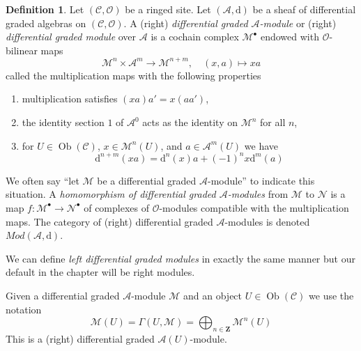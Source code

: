 \documentclass{stacks-project}
\theoremstyle{plain}
\theoremstyle{definition}
\newtheorem{definition}[subsection]{Definition}
\theoremstyle{remark}
\numberwithin{equation}{subsection}
\def\Ob{\mathop{\mathrm{Ob}}\nolimits}
\begin{document}
\begin{definition}
\label{definition-dgm}
Let $(\mathcal{C}, \mathcal{O})$ be a ringed site.
Let $(\mathcal{A}, \text{d})$ be a sheaf of differential graded algebras
on $(\mathcal{C}, \mathcal{O})$.
A (right) {\it differential graded $\mathcal{A}$-module} or (right)
{\it differential graded module} over $\mathcal{A}$
is a cochain complex $\mathcal{M}^\bullet$ endowed with
$\mathcal{O}$-bilinear maps
$$
\mathcal{M}^n \times \mathcal{A}^m \to \mathcal{M}^{n + m},\quad
(x, a) \longmapsto xa
$$
called the multiplication maps with the following properties
\begin{enumerate}
\item multiplication satisfies $(xa)a' = x(aa')$,
\item the identity section $1$ of $\mathcal{A}^0$
acts as the identity on $\mathcal{M}^n$ for all $n$,
\item for $U \in \Ob(\mathcal{C})$, $x \in \mathcal{M}^n(U)$, and
$a \in \mathcal{A}^m(U)$ we have
$$
\text{d}^{n + m}(xa) = \text{d}^n(x)a + (-1)^n x\text{d}^m(a)
$$
\end{enumerate}
We often say ``let $\mathcal{M}$ be a differential graded
$\mathcal{A}$-module'' to indicate this situation.
A {\it homomorphism of differential graded $\mathcal{A}$-modules}
from $\mathcal{M}$ to $\mathcal{N}$ is a map
$f : \mathcal{M}^\bullet \to \mathcal{N}^\bullet$ of complexes
of $\mathcal{O}$-modules compatible with the multiplication maps.
The category of (right) differential graded $\mathcal{A}$-modules
is denoted $\textit{Mod}(\mathcal{A}, \text{d})$.
\end{definition}

\noindent
We can define {\it left differential graded modules} in exactly the same manner
but our default in the chapter will be right modules.

\medskip\noindent
Given a differential graded $\mathcal{A}$-module $\mathcal{M}$
and an object $U \in \Ob(\mathcal{C})$ we use the notation
$$
\mathcal{M}(U) =
\Gamma(U, \mathcal{M}) =
\bigoplus\nolimits_{n \in \mathbf{Z}} \mathcal{M}^n(U)
$$
This is a (right) differential graded $\mathcal{A}(U)$-module.
\end{document}
